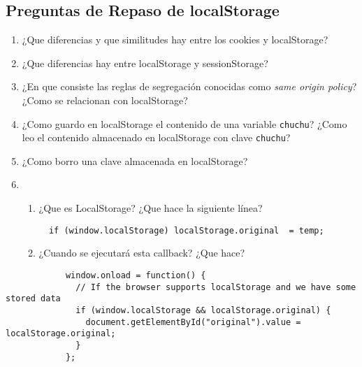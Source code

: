 \subsection{Preguntas de Repaso de
localStorage}\label{preguntas-de-repaso-de-localstorage}

\begin{enumerate}
\def\labelenumi{\arabic{enumi}.}
\item
  ¿Que diferencias y que similitudes hay entre los cookies y
  localStorage?
\item
  ¿Que diferencias hay entre localStorage y sessionStorage?
\item
  ¿En que consiste las reglas de segregación conocidas como {\emph{same
  origin policy}}? ¿Como se relacionan con localStorage?
\item
  ¿Como guardo en localStorage el contenido de una variable
  \texttt{chuchu}? ¿Como leo el contenido almacenado en localStorage con
  clave \texttt{chuchu}?
\item
  ¿Como borro una clave almacenada en localStorage?
\item
  \begin{enumerate}
  \def\labelenumii{\arabic{enumii}.}
  \item
    ¿Que es LocalStorage? ¿Que hace la siguiente línea?

\begin{verbatim}
  if (window.localStorage) localStorage.original  = temp;
\end{verbatim}
  \item
    ¿Cuando se ejecutará esta callback? ¿Que hace?
  \end{enumerate}
\end{enumerate}

\begin{verbatim}
            window.onload = function() {
              // If the browser supports localStorage and we have some stored data
              if (window.localStorage && localStorage.original) {
                document.getElementById("original").value = localStorage.original;
              }
            };
\end{verbatim}
